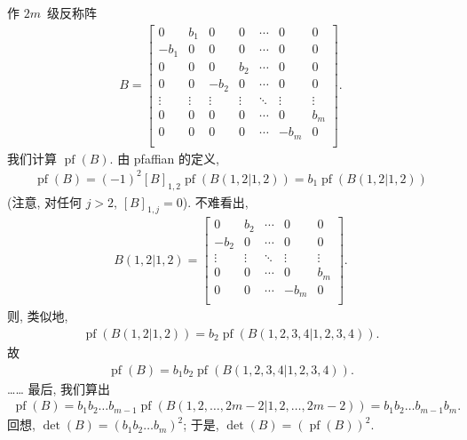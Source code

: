\documentclass[../libro.tex]{subfiles}
\begin{document}
\begin{example}
    作 \(2m\)~级反称阵
    \begin{align*}
        B =
        \begin{bmatrix}
            0      & b_1    & 0      & 0      & \cdots & 0      & 0      \\
            -b_1   & 0      & 0      & 0      & \cdots & 0      & 0      \\
            0      & 0      & 0      & b_2    & \cdots & 0      & 0      \\
            0      & 0      & -b_2   & 0      & \cdots & 0      & 0      \\
            \vdots & \vdots & \vdots & \vdots & \ddots & \vdots & \vdots \\
            0      & 0      & 0      & 0      & \cdots & 0      & b_m    \\
            0      & 0      & 0      & 0      & \cdots & -b_m   & 0      \\
        \end{bmatrix}.
    \end{align*}
    我们计算 \(\operatorname{pf} (B)\).
    由 pfaffian 的定义,
    \begin{align*}
        \operatorname{pf} {(B)}
        = (-1)^2 [B]_{1,2} \operatorname{pf} {(B({1,2}|{1,2}))}
        = b_1 \operatorname{pf} {(B({1,2}|{1,2}))}
    \end{align*}
    (注意, 对任何 \(j > 2\), \([B]_{1,j} = 0\)).
    不难看出,
    \begin{align*}
        B({1,2}|{1,2}) =
        \begin{bmatrix}
            0      & b_2    & \cdots & 0      & 0      \\
            -b_2   & 0      & \cdots & 0      & 0      \\
            \vdots & \vdots & \ddots & \vdots & \vdots \\
            0      & 0      & \cdots & 0      & b_m    \\
            0      & 0      & \cdots & -b_m   & 0      \\
        \end{bmatrix}.
    \end{align*}
    则, 类似地,
    \begin{align*}
        \operatorname{pf} {(B({1,2}|{1,2}))}
        = b_2 \operatorname{pf} {(B({1,2,3,4}|{1,2,3,4}))}.
    \end{align*}
    故
    \begin{align*}
        \operatorname{pf} {(B)}
        = b_1 b_2 \operatorname{pf} {(B({1,2,3,4}|{1,2,3,4}))}.
    \end{align*}
    ……
    最后, 我们算出
    \begin{align*}
        \operatorname{pf} {(B)}
        = b_1 b_2 \dots b_{m-1}
        \operatorname{pf} {(
                B({1,2,\dots,2m-2}|{1,2,\dots,2m-2})
        )}
        = b_1 b_2 \dots b_{m-1} b_m.
    \end{align*}
    回想, \(\det {(B)} = (b_1 b_2 \dots b_m)^2\);
    于是, \(\det {(B)} = (\operatorname{pf} {(B)})^2\).
\end{example}
\end{document}
